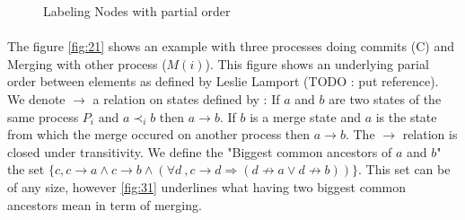\begin{figure}[H]
\begin{minipage}{0.3\textwidth}
{
 }
 \caption{Labeling Nodes with partial order}  \label{fig:23}
\end{minipage}

\end{figure}

\paragraph{} The figure \ref{fig:21} shows an example with three processes doing commits (C) and Merging with other process ($M(i)$). This figure shows an underlying parial order between elements as defined by Leslie Lamport (TODO : put reference). We denote $\rightarrow$ a relation on states defined by : If $a$ and $b$ are two states of the same process $P_i$ and $a \prec_i b$ then $a \rightarrow b$. If $b$ is a merge state and $a$ is the state from which the merge occured on another process then $a \rightarrow b$. The $\rightarrow$ relation is closed under transitivity. We define the "Biggest common ancestors of $a$ and $b$" the set 
$\{c, 
c\rightarrow a 
\wedge 
c \rightarrow b 
\wedge 
\left ( 
\forall d\ ,
c \rightarrow d \Rightarrow \left ( d \nrightarrow a \vee d \nrightarrow b \right )
\right )
\}$. This set can be of any size, however \ref{fig:31} underlines what having two biggest common ancestors mean in term of merging. 
